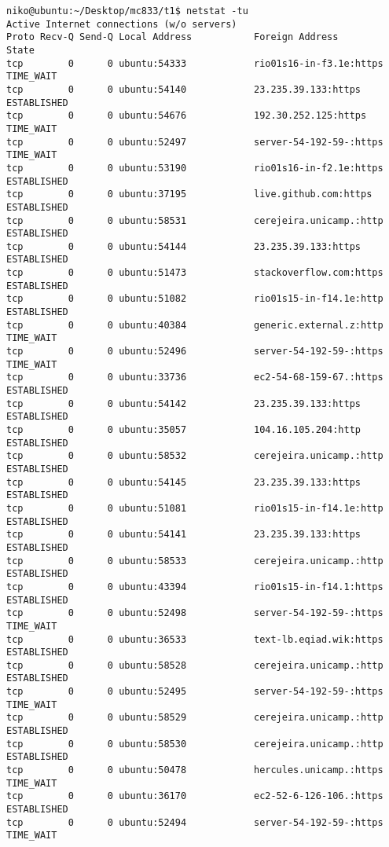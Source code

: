 \documentclass[a4paper,10pt]{article}
\begin{document}
\begin{lstlisting}
niko@ubuntu:~/Desktop/mc833/t1$ netstat -tu
Active Internet connections (w/o servers)
Proto Recv-Q Send-Q Local Address           Foreign Address         State      
tcp        0      0 ubuntu:54333            rio01s16-in-f3.1e:https TIME_WAIT  
tcp        0      0 ubuntu:54140            23.235.39.133:https     ESTABLISHED
tcp        0      0 ubuntu:54676            192.30.252.125:https    TIME_WAIT  
tcp        0      0 ubuntu:52497            server-54-192-59-:https TIME_WAIT  
tcp        0      0 ubuntu:53190            rio01s16-in-f2.1e:https ESTABLISHED
tcp        0      0 ubuntu:37195            live.github.com:https   ESTABLISHED
tcp        0      0 ubuntu:58531            cerejeira.unicamp.:http ESTABLISHED
tcp        0      0 ubuntu:54144            23.235.39.133:https     ESTABLISHED
tcp        0      0 ubuntu:51473            stackoverflow.com:https ESTABLISHED
tcp        0      0 ubuntu:51082            rio01s15-in-f14.1e:http ESTABLISHED
tcp        0      0 ubuntu:40384            generic.external.z:http TIME_WAIT  
tcp        0      0 ubuntu:52496            server-54-192-59-:https TIME_WAIT  
tcp        0      0 ubuntu:33736            ec2-54-68-159-67.:https ESTABLISHED
tcp        0      0 ubuntu:54142            23.235.39.133:https     ESTABLISHED
tcp        0      0 ubuntu:35057            104.16.105.204:http     ESTABLISHED
tcp        0      0 ubuntu:58532            cerejeira.unicamp.:http ESTABLISHED
tcp        0      0 ubuntu:54145            23.235.39.133:https     ESTABLISHED
tcp        0      0 ubuntu:51081            rio01s15-in-f14.1e:http ESTABLISHED
tcp        0      0 ubuntu:54141            23.235.39.133:https     ESTABLISHED
tcp        0      0 ubuntu:58533            cerejeira.unicamp.:http ESTABLISHED
tcp        0      0 ubuntu:43394            rio01s15-in-f14.1:https ESTABLISHED
tcp        0      0 ubuntu:52498            server-54-192-59-:https TIME_WAIT  
tcp        0      0 ubuntu:36533            text-lb.eqiad.wik:https ESTABLISHED
tcp        0      0 ubuntu:58528            cerejeira.unicamp.:http ESTABLISHED
tcp        0      0 ubuntu:52495            server-54-192-59-:https TIME_WAIT  
tcp        0      0 ubuntu:58529            cerejeira.unicamp.:http ESTABLISHED
tcp        0      0 ubuntu:58530            cerejeira.unicamp.:http ESTABLISHED
tcp        0      0 ubuntu:50478            hercules.unicamp.:https TIME_WAIT  
tcp        0      0 ubuntu:36170            ec2-52-6-126-106.:https ESTABLISHED
tcp        0      0 ubuntu:52494            server-54-192-59-:https TIME_WAIT  

\end{lstlisting}
\end{document}
